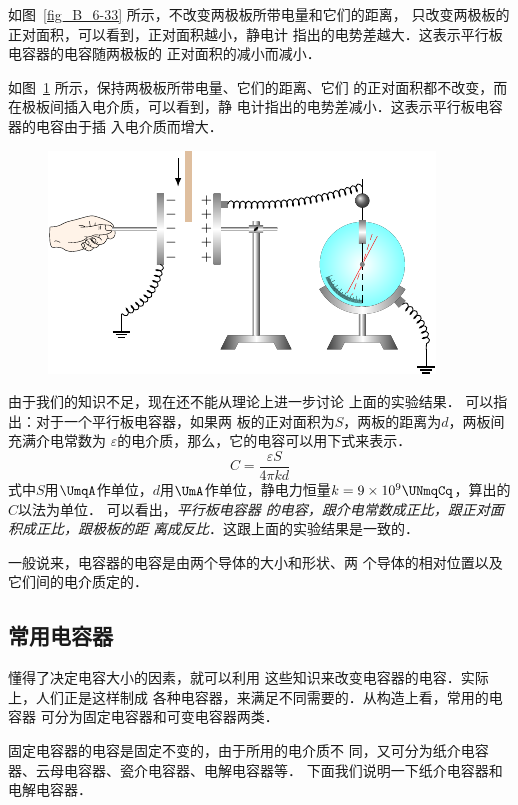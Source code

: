     如图~\ref{fig_B_6-33} 所示，不改变两极板所带电量和它们的距离，
    只改变两极板的正对面积，可以看到，正对面积越小，静电计
    指出的电势差越大．这表示平行板电容器的电容随两极板的
    正对面积的减小而减小．
   

    如图~\ref{fig_B_6-34} 所示，保持两极板所带电量、它们的距离、它们
    的正对面积都不改变，而在极板间插入电介质，可以看到，静
    电计指出的电势差减小．这表示平行板电容器的电容由于插
    入电介质而增大．
	
	 \begin{figure}[htbp]
		\centering
		\includegraphics{fig/B/6-34.pdf}
		\caption{}\label{fig_B_6-34}
	\end{figure}



    由于我们的知识不足，现在还不能从理论上进一步讨论
    上面的实验结果．
    可以指出：对于一个平行板电容器，如果两
    板的正对面积为$S$，两板的距离为$d$，两板间充满介电常数为
    $\varepsilon$的电介质，那么，它的电容可以用下式来表示．
\[C=\frac{\varepsilon S}{4\pi kd} \]
式中$S$用$\UmqA$作单位，$d$用$\UmA$作单位，静电力恒量$k=9\times 10^9 \UNmqCq$，算出的$C$以法为单位．
可以看出，\textit{平行板电容器
的电容，跟介电常数成正比，跟正对面积成正比，跟极板的距
离成反比}．这跟上面的实验结果是一致的．

一般说来，电容器的电容是由两个导体的大小和形状、两
个导体的相对位置以及它们间的电介质定的．

\subsection{常用电容器}

懂得了决定电容大小的因素，就可以利用
这些知识来改变电容器的电容．实际上，人们正是这样制成
各种电容器，来满足不同需要的．从构造上看，常用的电容器
可分为固定电容器和可变电容器两类．

固定电容器的电容是固定不变的，由于所用的电介质不
同，又可分为纸介电容器、云母电容器、瓷介电容器、电解电容器等．
下面我们说明一下纸介电容器和电解电容器．

